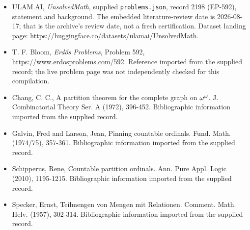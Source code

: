 \documentclass[11pt,a4paper]{article}
\begin{document}
{\small

\begin{itemize}

\item[\hypertarget{source:2198:1}{S1}] ULAM.AI, \emph{UnsolvedMath}, supplied \texttt{problems.json}, record 2198 (EP-592), statement and background. The embedded literature-review date is 2026-08-17; that is the archive’s review date, not a fresh certification. Dataset landing page: \url{https://huggingface.co/datasets/ulamai/UnsolvedMath}.

\item[\hypertarget{source:2198:2}{S2}] T. F. Bloom, \emph{Erdős Problems}, Problem 592, \url{https://www.erdosproblems.com/592}. Reference imported from the supplied record; the live problem page was not independently checked for this compilation.

\item[\hypertarget{source:2198:3}{S3}] Chang, C. C., A partition theorem for the complete graph on {$\omega\sp{\omega }$}. J. Combinatorial Theory Ser. A (1972), 396-452. Bibliographic information imported from the supplied record.

\item[\hypertarget{source:2198:4}{S4}] Galvin, Fred and Larson, Jean, Pinning countable ordinals. Fund. Math. (1974/75), 357-361. Bibliographic information imported from the supplied record.

\item[\hypertarget{source:2198:5}{S5}] Schipperus, Rene, Countable partition ordinals. Ann. Pure Appl. Logic (2010), 1195-1215. Bibliographic information imported from the supplied record.

\item[\hypertarget{source:2198:6}{S6}] Specker, Ernst, Teilmengen von Mengen mit Relationen. Comment. Math. Helv. (1957), 302-314. Bibliographic information imported from the supplied record.

\end{itemize}

}

\label{end:2198}
\end{document}
